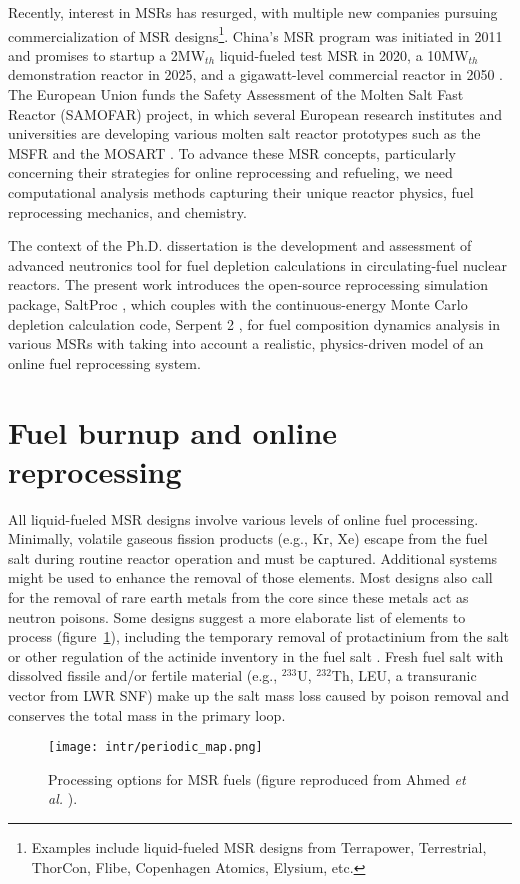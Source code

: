 Recently, interest in \glspl{MSR} has resurged, with multiple new companies 
pursuing commercialization of \gls{MSR} designs\footnote{Examples include 
liquid-fueled \gls{MSR} designs from Terrapower, Terrestrial, ThorCon, Flibe, 
Copenhagen Atomics, Elysium, etc.}. China's \gls{MSR} program was initiated in 
2011 and promises to startup a 2MW$_{th}$ liquid-fueled test \gls{MSR} in 
2020, a 10MW$_{th}$ demonstration reactor in 2025, and a gigawatt-level 
commercial reactor in 2050 \cite{zhang_review_2018}. The European 
Union funds the Safety Assessment of the Molten Salt Fast Reactor 
(SAMOFAR) project, in which several European research institutes and 
universities are developing various molten salt reactor prototypes 
such as the \gls{MSFR} \cite{fiorina_molten_2013} and the \gls{MOSART} 
\cite{ignatiev_molten_2014}. To advance these \gls{MSR} concepts, particularly 
concerning their strategies for online reprocessing and refueling, we need 
computational analysis methods capturing their unique reactor 
physics, fuel reprocessing mechanics, and chemistry.

The context of the Ph.D. dissertation is the development and assessment of 
advanced neutronics tool for fuel depletion calculations in circulating-fuel 
nuclear reactors. The present work introduces the open-source reprocessing 
simulation package, SaltProc \cite{rykhlevskii_arfc/saltproc_2018}, which 
couples with the continuous-energy Monte Carlo depletion calculation code, 
Serpent 2 \cite{leppanen_serpent_2014}, for fuel composition dynamics analysis 
in various \glspl{MSR} with taking into account a realistic, physics-driven
model of an online fuel reprocessing system.

\section{Fuel burnup and online reprocessing}\label{sec:litreview}
All liquid-fueled \gls{MSR} designs involve various levels of online fuel 
processing. Minimally, volatile gaseous fission products (e.g., Kr, Xe) 
escape from the fuel salt during routine reactor operation and must be 
captured. Additional systems might be used to enhance the removal of those 
elements. Most designs also call for the removal of rare earth metals from 
the core since these metals act as neutron poisons. Some designs suggest a 
more elaborate list of elements to process (figure~\ref{fig:periodic_tab}), 
including the temporary removal of protactinium from the salt or other 
regulation of the actinide inventory in the fuel salt 
\cite{ahmad_neutronics_2015}. Fresh fuel salt with dissolved fissile and/or 
fertile material (e.g., $^{233}$U, $^{232}$Th, \gls{LEU}, a transuranic 
vector from \gls{LWR} \gls{SNF}) make up the salt mass loss caused by poison 
removal and conserves the total mass in the primary loop.
\begin{figure}[htp!] %
	\centering
	\texttt{[image: intr/periodic\_map.png]}
	\caption{Processing options for \gls{MSR} fuels (figure reproduced from 
		Ahmed \emph{et al.} \cite{ahmad_neutronics_2015}).}
	\label{fig:periodic_tab}
\end{figure}

